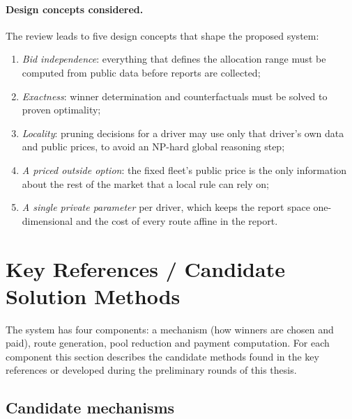 \paragraph{Design concepts considered.} The review leads to five design
concepts that shape the proposed system:
\begin{enumerate}[label=(\alph*),leftmargin=1cm,itemsep=2pt]
\item \emph{Bid independence}: everything that defines the allocation range
must be computed from public data before reports are collected;
\item \emph{Exactness}: winner determination and counterfactuals must be
solved to proven optimality;
\item \emph{Locality}: pruning decisions for a driver may use only that
driver's own data and public prices, to avoid an NP-hard global reasoning
step;
\item \emph{A priced outside option}: the fixed fleet's public price is the
only information about the rest of the market that a local rule can rely on;
\item \emph{A single private parameter} per driver, which keeps the report
space one-dimensional and the cost of every route affine in the report.
\end{enumerate}

\section{Key References / Candidate Solution Methods}
\label{sec:candidates}

The system has four components: a mechanism (how winners are chosen and
paid), route generation, pool reduction and payment computation. For each
component this section describes the candidate methods found in the key
references or developed during the preliminary rounds of this thesis.

\subsection{Candidate mechanisms}

